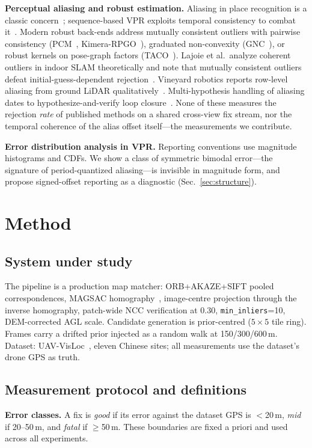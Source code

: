 \documentclass[journal]{IEEEtran}
\begin{document}
\textbf{Perceptual aliasing and robust estimation.} Aliasing in place recognition is a classic concern~\cite{lowry2016}; sequence-based VPR exploits temporal consistency to combat it~\cite{seqvpr}. Modern robust back-ends address mutually consistent outliers with pairwise consistency (PCM~\cite{mangelson2018}, Kimera-RPGO~\cite{kimera}), graduated non-convexity (GNC~\cite{yang2020}), or robust kernels on pose-graph factors (TACO~\cite{taco}). Lajoie et al.\ analyze coherent outliers in indoor SLAM theoretically and note that mutually consistent outliers defeat initial-guess-dependent rejection~\cite{lajoie2019}. Vineyard robotics reports row-level aliasing from ground LiDAR qualitatively~\cite{desilva2025,desilva2026}. Multi-hypothesis handling of aliasing dates to hypothesize-and-verify loop closure~\cite{tanaka2016}. None of these measures the rejection \emph{rate} of published methods on a shared cross-view fix stream, nor the temporal coherence of the alias offset itself---the measurements we contribute.

\textbf{Error distribution analysis in VPR.} Reporting conventions use magnitude histograms and CDFs. We show a class of symmetric bimodal error---the signature of period-quantized aliasing---is invisible in magnitude form, and propose signed-offset reporting as a diagnostic (Sec.~\ref{sec:structure}).

\section{Method}

\subsection{System under study}
The pipeline is a production map matcher: ORB+AKAZE+SIFT pooled correspondences, MAGSAC homography~\cite{magsac}, image-centre projection through the inverse homography, patch-wide NCC verification at 0.30, \texttt{min\_inliers}=10, DEM-corrected AGL scale. Candidate generation is prior-centred ($5\times5$ tile ring). Frames carry a drifted prior injected as a random walk at 150/300/600\,m. Dataset: UAV-VisLoc~\cite{uavvisloc}, eleven Chinese sites; all measurements use the dataset's drone GPS as truth.

\subsection{Measurement protocol and definitions}
\textbf{Error classes.} A fix is \emph{good} if its error against the dataset GPS is $<$20\,m, \emph{mid} if 20--50\,m, and \emph{fatal} if $\geq$50\,m. These boundaries are fixed a priori and used across all experiments.
\end{document}
